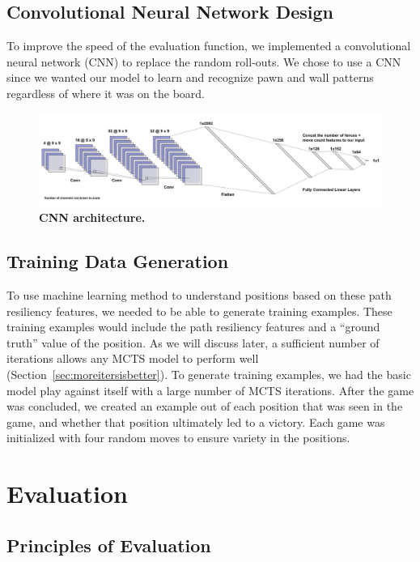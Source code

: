 \documentclass[10pt]{article}
\begin{document}
\subsection{Convolutional Neural Network Design}
To improve the speed of the evaluation function, we implemented a convolutional neural network (CNN) to replace the random roll-outs. We chose to use a CNN since we wanted our model to learn and recognize pawn and wall patterns regardless of where it was on the board. 
\begin{figure}[H]
    \centering
    \includegraphics[width=\linewidth]{cnn_arch.png}
    \caption{\textbf{CNN architecture.}}
    \label{fig:cnn_arch}
\end{figure}
\subsection{Training Data Generation}

To use machine learning method to understand positions based on these path resiliency features, we needed to be able to generate training examples. These training examples would include the path resiliency features and a ``ground truth'' value of the position. As we will discuss later, a sufficient number of iterations allows any MCTS model to perform well (Section~\ref{sec:moreitersisbetter}). To generate training examples, we had the basic model play against itself with a large number of MCTS iterations. After the game was concluded, we created an example out of each position that was seen in the game, and whether that position ultimately led to a victory. Each game was initialized with four random moves to ensure variety in the positions. 


\section{Evaluation}

\subsection{Principles of Evaluation}
\end{document}
